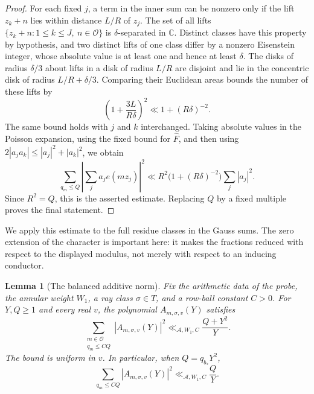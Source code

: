 \documentclass[11pt,a4paper]{article}
\numberwithin{equation}{section}
\numberwithin{figure}{section}
\newtheorem{lemma}[theorem]{Lemma}
\theoremstyle{definition}
\theoremstyle{remark}
\begin{document}
\begin{proof}
For each fixed $j$, a term in the inner sum can be nonzero only if the lift
$z_k+n$ lies within distance $L/R$ of $z_j$.  The set of all lifts
$\{z_k+n:1\le k\le J,\ n\in\mathcal O\}$ is $\delta$-separated in
$\mathbb C$.  Distinct classes have this property by hypothesis, and two
distinct lifts of one class differ by a nonzero Eisenstein integer, whose
absolute value is at least one and hence at least $\delta$.
The disks of radius $\delta/3$ about lifts in a disk of radius $L/R$ are
disjoint and lie in the concentric disk of radius $L/R+\delta/3$.
Comparing their Euclidean areas bounds the number of these lifts by
\[
 \left(1+\frac{3L}{R\delta}\right)^2
 \ll 1+(R\delta)^{-2}.
\]
The same bound holds with $j$ and $k$ interchanged.  Taking absolute values
in the Poisson expansion, using the fixed bound for $\widehat F$, and then
using $2|a_ja_k|\le |a_j|^2+|a_k|^2$, we obtain
\[
 \sum_{q_m\le Q}\left|\sum_j a_je(mz_j)\right|^2
 \ll R^2\bigl(1+(R\delta)^{-2}\bigr)\sum_j|a_j|^2.
\]
Since $R^2=Q$, this is the asserted estimate.  Replacing $Q$ by a fixed
multiple proves the final statement.
\end{proof}

We apply this estimate to the full residue classes in the Gauss sums.
The zero extension of the character is important here: it makes the
fractions reduced with respect to the displayed modulus, not merely with
respect to an inducing conductor.

\begin{lemma}[The balanced additive norm]
\label{lem:balanced-additive-norm}
Fix the arithmetic data of the probe, the annular weight $W_1$, a ray class
$\sigma\in T$, and a row-ball constant $C>0$.  For $Y,Q\ge1$ and every
real $v$, the polynomial $A_{m,\sigma,v}(Y)$ satisfies
\[
 \sum_{\substack{m\in\mathcal O\\q_m\le CQ}}
       |A_{m,\sigma,v}(Y)|^2
 \ll_{\mathcal A,W_1,C}\frac{Q+Y^2}{Y}.
\]
The bound is uniform in $v$.  In particular, when $Q=q_{b_*}Y^2$,
\[
 \sum_{q_m\le CQ}|A_{m,\sigma,v}(Y)|^2
 \ll_{\mathcal A,W_1,C}\frac QY.
\]
\end{lemma}
\end{document}

